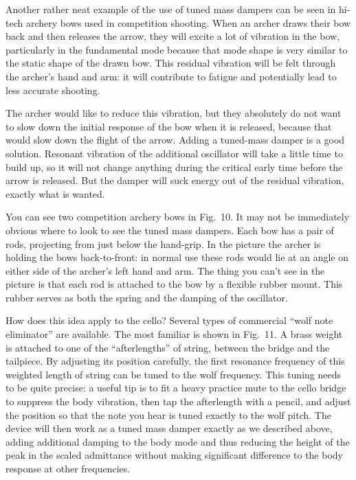   Another rather neat example of the use of tuned mass dampers can be seen in 
  hi-tech archery bows used in competition shooting. When an archer draws their 
  bow back and then releases the arrow, they will excite a lot of vibration in 
  the bow, particularly in the fundamental mode because that mode shape is very 
  similar to the static shape of the drawn bow. This residual vibration will be 
  felt through the archer’s hand and arm: it will contribute to fatigue and 
  potentially lead to less accurate shooting. 

  The archer would like to reduce this vibration, but they absolutely do not 
  want to slow down the initial response of the bow when it is released, 
  because that would slow down the flight of the arrow. Adding a tuned-mass 
  damper is a good solution. Resonant vibration of the additional oscillator 
  will take a little time to build up, so it will not change anything during 
  the critical early time before the arrow is released. But the damper will 
  suck energy out of the residual vibration, exactly what is wanted. 

  You can see two competition archery bows in Fig.\ 10. It may not be 
  immediately obvious where to look to see the tuned mass dampers. Each bow has 
  a pair of rods, projecting from just below the hand-grip. In the picture the 
  archer is holding the bows back-to-front: in normal use these rods would lie 
  at an angle on either side of the archer’s left hand and arm. The thing you 
  can't see in the picture is that each rod is attached to the bow by a 
  flexible rubber mount. This rubber serves as both the spring and the damping 
  of the oscillator. 

  How does this idea apply to the cello? Several types of commercial “wolf note 
  eliminator” are available. The most familiar is shown in Fig.\ 11. A brass 
  weight is attached to one of the “afterlengths” of string, between the bridge 
  and the tailpiece. By adjusting its position carefully, the first resonance 
  frequency of this weighted length of string can be tuned to the wolf 
  frequency. This tuning needs to be quite precise: a useful tip is to fit a 
  heavy practice mute to the cello bridge to suppress the body vibration, then 
  tap the afterlength with a pencil, and adjust the position so that the note 
  you hear is tuned exactly to the wolf pitch. The device will then work as a 
  tuned mass damper exactly as we described above, adding additional damping to 
  the body mode and thus reducing the height of the peak in the scaled 
  admittance without making significant difference to the body response at 
  other frequencies. 

